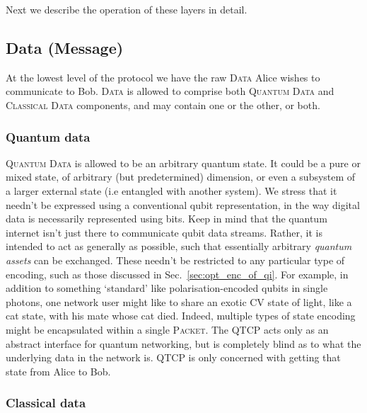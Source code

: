 \documentclass[aps, rmp, twocolumn, amsmath, amssymb, nofootinbib, superscriptaddress, longbibliography, floatfix, table-of-contents, eqsecnum]{revtex4-1}
\begin{document}
Next we describe the operation of these layers in detail.

%
%

\subsection{Data (Message)} 

At the lowest level of the protocol we have the raw \textsc{Data} Alice wishes to communicate to Bob. \textsc{Data} is allowed to comprise both \textsc{Quantum Data} and \textsc{Classical Data} components, and may contain one or the other, or both.

%
%

\subsubsection{Quantum data} 

\textsc{Quantum Data} is allowed to be an arbitrary quantum state. It could be a pure or mixed state, of arbitrary (but predetermined) dimension, or even a subsystem of a larger external state (i.e entangled with another system). We stress that it needn't be expressed using a conventional qubit representation, in the way digital data is necessarily represented using bits. Keep in mind that the quantum internet isn't just there to communicate qubit data streams. Rather, it is intended to act as generally as possible, such that essentially arbitrary \textit{quantum assets} can be exchanged. These needn't be restricted to any particular type of encoding, such as those discussed in Sec.~\ref{sec:opt_enc_of_qi}. For example, in addition to something `standard' like polarisation-encoded qubits in single photons, one network user might like to share an exotic CV state of light, like a cat state, with his mate whose cat died. Indeed, multiple types of state encoding might be encapsulated within a single \textsc{Packet}. The QTCP acts only as an abstract interface for quantum networking, but is completely blind as to what the underlying data in the network is. QTCP is only concerned with getting that state from Alice to Bob.

%
%

\subsubsection{Classical data} 
\end{document}
